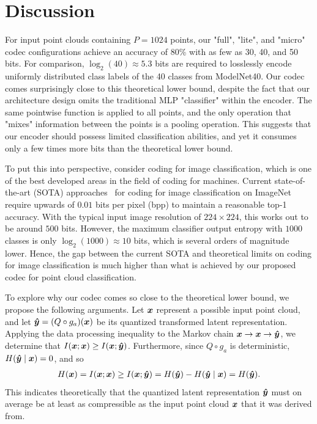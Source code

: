 \section{Discussion}
\label{sec:discussion}

For input point clouds containing $P = 1024$ points, our "full", "lite", and "micro" codec configurations achieve an accuracy of 80\% with as few as 30, 40, and 50 bits.
For comparison, $\log_2(40) \approx 5.3$ bits are required to losslessly encode uniformly distributed class labels of the 40 classes from ModelNet40.
Our codec comes surprisingly close to this theoretical lower bound, despite the fact that our architecture design omits the traditional MLP "classifier" within the encoder.
The same pointwise function is applied to all points, and the only operation that "mixes" information between the points is a pooling operation.
This suggests that our encoder should possess limited classification abilities, and yet it consumes only a few times more bits than the theoretical lower bound.

To put this into perspective, consider coding for image classification, which is one of the best developed areas in the field of coding for machines.
Current state-of-the-art (SOTA) approaches~\cite{matsubara2022wacv,duan2022pcs,Ahuja_2023_CVPR} for coding for image classification on ImageNet~\cite{ImageNet} require upwards of $0.01$ bits per pixel (bpp) to maintain a reasonable top-1 accuracy.
With the typical input image resolution of $224 \times 224$, this works out to be around $500$ bits.
However, the maximum classifier output entropy with $1000$ classes is only $\log_2(1000) \approx 10$ bits, which is several orders of magnitude lower.
Hence, the gap between the current SOTA and theoretical limits on coding for image classification is much higher than what is achieved by our proposed codec for point cloud classification.

To explore why our codec comes so close to the theoretical lower bound, we propose the following arguments.
Let ${\boldsymbol{x}}$ represent a possible input point cloud, and
let ${\boldsymbol{\hat{y}}} = (Q \circ g_a)({\boldsymbol{x}})$ be its quantized transformed latent representation.
Applying the data processing inequality to the Markov chain
${\boldsymbol{x}} \to {\boldsymbol{x}} \to {\boldsymbol{\hat{y}}}$,
we determine that
$I({\boldsymbol{x}}; {\boldsymbol{x}}) \geq I({\boldsymbol{x}}; {\boldsymbol{\hat{y}}})$.
Furthermore, since $Q \circ g_a$ is deterministic,
$H({\boldsymbol{\hat{y}}} \mid {\boldsymbol{x}}) = 0$, and so
\begin{align*}
  H({\boldsymbol{x}})
  = I({\boldsymbol{x}}; {\boldsymbol{x}})
  \geq I({\boldsymbol{x}}; {\boldsymbol{\hat{y}}})
  = H({\boldsymbol{\hat{y}}}) - H({\boldsymbol{\hat{y}}} \mid {\boldsymbol{x}})
  = H({\boldsymbol{\hat{y}}}).
\end{align*}
This indicates theoretically that the quantized latent representation ${\boldsymbol{\hat{y}}}$ must on average be at least as compressible as the input point cloud ${\boldsymbol{x}}$ that it was derived from.

